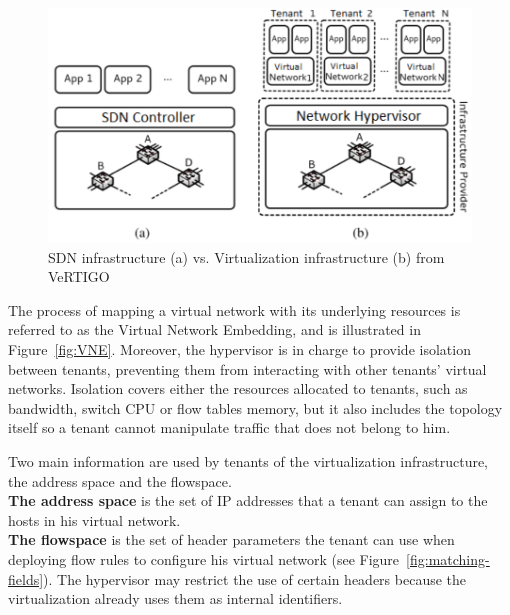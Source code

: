 \begin{figure}[ht]
    \centering
    \includegraphics[scale=0.9]{figures/virt-archi.pdf}
    \caption{SDN infrastructure (a) vs. Virtualization infrastructure (b) from VeRTIGO~\cite{VeRTIGO-Corin2012a}}
    \label{fig:virt-archi}
\end{figure}


The process of mapping a virtual network with its underlying resources is referred to as the Virtual Network Embedding, and is illustrated in Figure~\ref{fig:VNE}.
Moreover, the hypervisor is in charge to provide isolation between tenants, preventing them from interacting with other tenants' virtual networks. Isolation covers either the resources allocated to tenants, such as bandwidth, switch CPU or flow tables memory, but it also includes the topology itself so a tenant cannot manipulate traffic that does not belong to him.

Two main information are used by tenants of the virtualization infrastructure, the address space and the flowspace.\\
\textbf{The address space} is the set of IP addresses that a tenant can assign to the hosts in his virtual network.\\
\textbf{The flowspace} is the set of header parameters the tenant can use when deploying flow rules to configure his virtual network (see Figure~\ref{fig:matching-fields}). The hypervisor may restrict the use of certain headers because the virtualization already uses them as internal identifiers.


